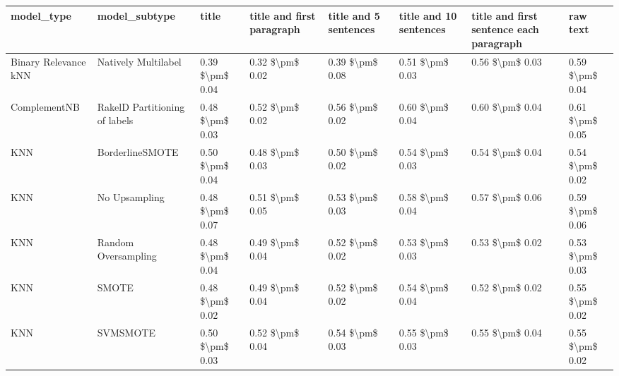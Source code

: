\begin{tabular}{llllllll}
\toprule
                     model\_type &                 model\_subtype &           title & title and first paragraph & title and 5 sentences & title and 10 sentences & title and first sentence each paragraph &            raw text \\
\midrule
           Binary Relevance kNN &           Natively Multilabel & 0.39 \$\textbackslash pm\$ 0.04 &           0.32 \$\textbackslash pm\$ 0.02 &       0.39 \$\textbackslash pm\$ 0.08 &        0.51 \$\textbackslash pm\$ 0.03 &                         0.56 \$\textbackslash pm\$ 0.03 &     0.59 \$\textbackslash pm\$ 0.04 \\
                   ComplementNB & RakelD Partitioning of labels & 0.48 \$\textbackslash pm\$ 0.03 &           0.52 \$\textbackslash pm\$ 0.02 &       0.56 \$\textbackslash pm\$ 0.02 &        0.60 \$\textbackslash pm\$ 0.04 &                         0.60 \$\textbackslash pm\$ 0.04 &     0.61 \$\textbackslash pm\$ 0.05 \\
                            KNN &               BorderlineSMOTE & 0.50 \$\textbackslash pm\$ 0.04 &           0.48 \$\textbackslash pm\$ 0.03 &       0.50 \$\textbackslash pm\$ 0.02 &        0.54 \$\textbackslash pm\$ 0.03 &                         0.54 \$\textbackslash pm\$ 0.04 &     0.54 \$\textbackslash pm\$ 0.02 \\
                            KNN &                 No Upsampling & 0.48 \$\textbackslash pm\$ 0.07 &           0.51 \$\textbackslash pm\$ 0.05 &       0.53 \$\textbackslash pm\$ 0.03 &        0.58 \$\textbackslash pm\$ 0.04 &                         0.57 \$\textbackslash pm\$ 0.06 &     0.59 \$\textbackslash pm\$ 0.06 \\
                            KNN &           Random Oversampling & 0.48 \$\textbackslash pm\$ 0.04 &           0.49 \$\textbackslash pm\$ 0.04 &       0.52 \$\textbackslash pm\$ 0.02 &        0.53 \$\textbackslash pm\$ 0.03 &                         0.53 \$\textbackslash pm\$ 0.02 &     0.53 \$\textbackslash pm\$ 0.03 \\
                            KNN &                         SMOTE & 0.48 \$\textbackslash pm\$ 0.02 &           0.49 \$\textbackslash pm\$ 0.04 &       0.52 \$\textbackslash pm\$ 0.02 &        0.54 \$\textbackslash pm\$ 0.04 &                         0.52 \$\textbackslash pm\$ 0.02 &     0.55 \$\textbackslash pm\$ 0.02 \\
                            KNN &                      SVMSMOTE & 0.50 \$\textbackslash pm\$ 0.03 &           0.52 \$\textbackslash pm\$ 0.04 &       0.54 \$\textbackslash pm\$ 0.03 &        0.55 \$\textbackslash pm\$ 0.03 &                         0.55 \$\textbackslash pm\$ 0.04 &     0.55 \$\textbackslash pm\$ 0.02 \\

\end{tabular}
